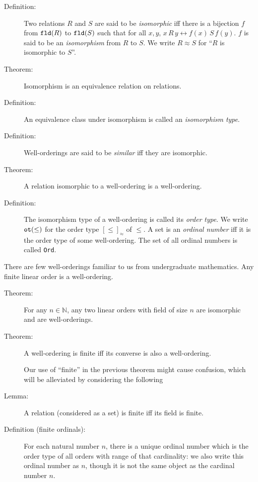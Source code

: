 \documentclass[12pt]{book}
\begin{document}
\begin{description}

\item[Definition:] Two relations $R$ and $S$ are said to be {\em
isomorphic\/} iff there is a bijection $f$ from ${\tt fld}(R)$ to
${\tt fld}(S)$ such that for all $x,y$, $x\,R\,y \leftrightarrow
f(x)\,S\,f(y)$.  $f$ is said to be an {\em isomorphism\/} from $R$ to
$S$.  We write $R \approx S$ for ``$R$ is isomorphic to $S$''.

\item[Theorem:]  Isomorphism is an equivalence relation on relations.

\item[Definition:] An equivalence class under isomorphism is called an
{\em isomorphism type\/}.

\item[Definition:]  Well-orderings are said to be {\em similar} iff they are isomorphic.

\item[Theorem:]  A relation isomorphic to a well-ordering is a well-ordering.

\item[Definition:] The isomorphism type of a well-ordering is called
its {\em order type\/}.  We write ${\tt ot}(\leq)$ for the order type
$[\leq]_{\approx}$ of $\leq$.  A set is an {\em ordinal number\/} iff
it is the order type of some well-ordering.  The set of all ordinal
numbers is called {\tt Ord\/}.
\end{description}
There are few well-orderings familiar to us from undergraduate mathematics.
Any finite linear order is a well-ordering.

\begin{description}

\item[Theorem:] For any $n \in {\mathbb N}$, any two linear orders
with field of size $n$ are isomorphic and are well-orderings.

\item[Theorem:] A well-ordering is finite iff its converse is also a
well-ordering.

Our use of ``finite'' in the previous theorem might cause confusion,
which will be alleviated by considering the following

\item[Lemma:] A relation (considered as a set) is finite iff its field
is finite.

\item[Definition (finite ordinals):] For each natural number $n$, there is a unique
ordinal number which is the order type of all orders with range of
that cardinality: we also write this ordinal number as $n$, though it
is not the same object as the cardinal number $n$.

\end{description}
\end{document}

